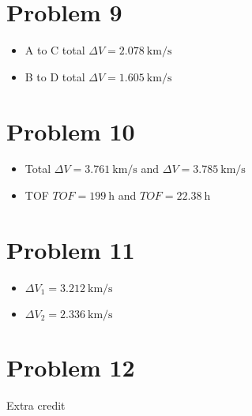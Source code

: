 \documentclass[10pt]{article}
\theoremstyle{definition}
\begin{document}
\section*{Problem 9}
\begin{itemize}
    \item A to C total \( \Delta V = \SI{2.078}{\kilo\meter\per\second}\)
    \item B to D total \( \Delta V = \SI{1.605}{\kilo\meter\per\second}\)
\end{itemize}

\section*{Problem 10}
\begin{itemize}
    \item Total \( \Delta V = \SI{3.761}{\kilo\meter\per\second}\) and \(\Delta V = \SI{3.785}{\kilo\meter\per\second}\)
    \item TOF \( TOF = \SI{199}{\hour}\) and \( TOF = \SI{22.38}{\hour}\)
\end{itemize}

\section*{Problem 11}

\begin{itemize}
    \item \( \Delta V_1 = \SI{3.212}{\kilo\meter\per\second}\)
    \item \( \Delta V_2 = \SI{2.336}{\kilo\meter\per\second}\)
\end{itemize}

\section*{Problem 12}

Extra credit
\end{document}
